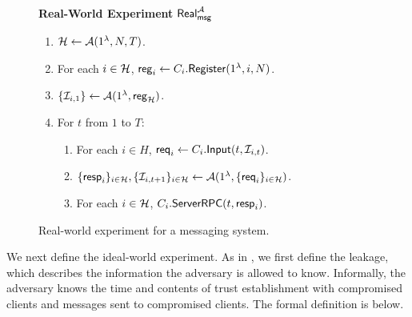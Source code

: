 \begin{figure}[ht]
\begin{framed}
\textbf{Real-World Experiment }$\mathsf{Real}_{\mathsf{msg}}^{\mathcal{A}}$
\begin{enumerate}
\item $\mathcal{H} \leftarrow \mathcal{A}(1^{\lambda}, N, T)$.
\item For each $i \in \mathcal{H}$, $\mathsf{reg}_i \leftarrow C_i.\mathsf{Register}(1^{\lambda}, i, N)$. 
\item $\{\mathcal{I}_{i, 1}\} \leftarrow \mathcal{A}(1^{\lambda}, \mathsf{reg}_{\mathcal{H}})$.
\item For $t$ from $1$ to $T$:
    \begin{enumerate}
    \item For each $i \in H$, $\mathsf{req}_i \leftarrow C_i.\mathsf{Input}(t, \mathcal{I}_{i, t})$.
    
    \item $\{\mathsf{resp}_i\}_{i \in \mathcal{H}}, \{\mathcal{I}_{i, t + 1}\}_{i \in \mathcal{H}} \leftarrow \mathcal{A}(1^{\lambda}, \{\mathsf{req}_i\}_{i \in \mathcal{H}})$.
    
    \item For each $i \in \mathcal{H}$, $C_i.\mathsf{ServerRPC}(t, \mathsf{resp}_i)$.
    \end{enumerate}
\end{enumerate}
\end{framed}
\caption{Real-world experiment for a messaging system.}
\label{expr:messaging-real-world}
\end{figure}

We next define the ideal-world experiment. As in \cite{shi2021non}, we first define the leakage, which describes the information the adversary is allowed to know. Informally, the adversary knows the time and contents of trust establishment with compromised clients and messages sent to compromised clients.
The formal definition is below.

